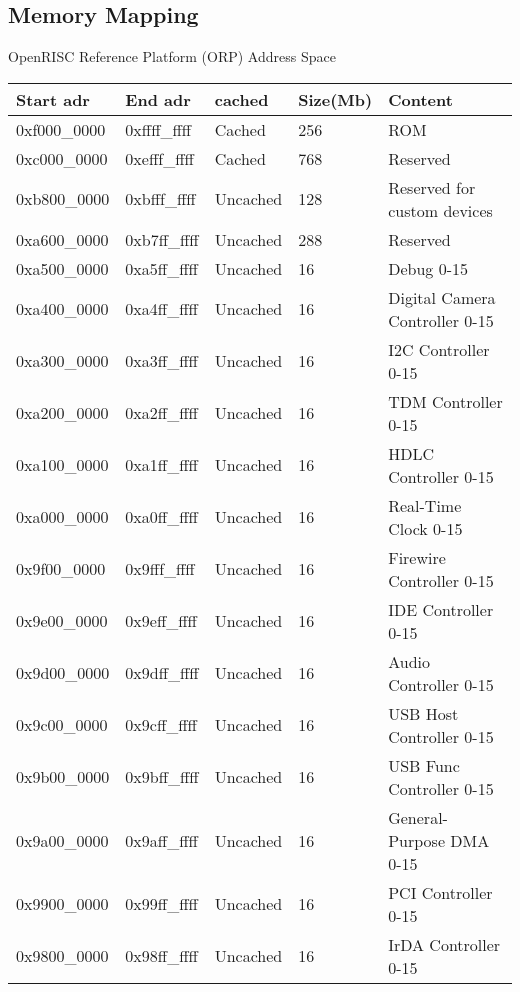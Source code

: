 \documentclass[10pt,a4paper]{article}
\begin{document}
\subsection{Memory Mapping}
OpenRISC Reference Platform (ORP) Address Space \\
\begin{tabular}{|l|l|l|l|l|}
\hline 
\textbf{Start adr} & \textbf{End adr} & \textbf{cached} & \textbf{Size(Mb)} & \textbf{Content} \\
\hline 
0xf000\_0000 & 0xffff\_ffff & Cached & 256 & ROM \\
\hline 
0xc000\_0000 & 0xefff\_ffff & Cached & 768 & Reserved \\
\hline 
0xb800\_0000 & 0xbfff\_ffff & Uncached & 128 & Reserved for custom devices \\
\hline 
0xa600\_0000 & 0xb7ff\_ffff & Uncached & 288 & Reserved \\
\hline 
0xa500\_0000 & 0xa5ff\_ffff & Uncached & 16 & Debug 0-15 \\
\hline 
0xa400\_0000 & 0xa4ff\_ffff & Uncached & 16 & Digital Camera Controller 0-15 \\
\hline 
0xa300\_0000 & 0xa3ff\_ffff & Uncached & 16 & I2C Controller 0-15 \\
\hline 
0xa200\_0000 & 0xa2ff\_ffff & Uncached & 16 & TDM Controller 0-15 \\
\hline 
0xa100\_0000 & 0xa1ff\_ffff & Uncached & 16 & HDLC Controller 0-15 \\
\hline 
0xa000\_0000 & 0xa0ff\_ffff & Uncached & 16 & Real-Time Clock 0-15 \\
\hline 
0x9f00\_0000 & 0x9fff\_ffff & Uncached & 16 & Firewire Controller 0-15 \\
\hline 
0x9e00\_0000 & 0x9eff\_ffff & Uncached & 16 & IDE Controller 0-15 \\
\hline 
0x9d00\_0000 & 0x9dff\_ffff & Uncached & 16 & Audio Controller 0-15 \\
\hline 
0x9c00\_0000 & 0x9cff\_ffff & Uncached & 16 & USB Host Controller 0-15 \\
\hline 
0x9b00\_0000 & 0x9bff\_ffff & Uncached & 16 & USB Func Controller 0-15 \\
\hline 
0x9a00\_0000 & 0x9aff\_ffff & Uncached & 16 & General-Purpose DMA 0-15 \\
\hline 
0x9900\_0000 & 0x99ff\_ffff & Uncached & 16 & PCI Controller 0-15 \\
\hline 
0x9800\_0000 & 0x98ff\_ffff & Uncached & 16 & IrDA Controller 0-15 \\
\hline 

\end{tabular}
\end{document}

